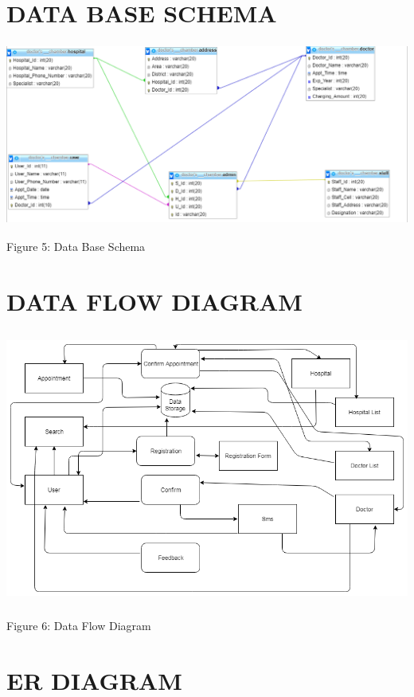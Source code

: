 \documentclass[12pt]{article}
\begin{document}
\pagebreak

\section{DATA BASE SCHEMA}

\includegraphics[height=6cm]{ER.PNG}
\begin{center}
 \caption{ Figure 5: Data Base Schema}
    
\end{center}

\section{DATA FLOW DIAGRAM}

\includegraphics[height=9cm]{Dataflow.png}
\begin{center}
 \caption{ Figure 6: Data Flow Diagram}
    
\end{center}

\pagebreak

\section{ER DIAGRAM}
\end{document}
